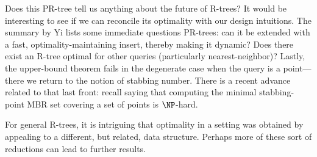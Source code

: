 Does this PR-tree tell us anything about the future of R-trees?
It would be interesting to see if we can reconcile its optimality with our design intuitions.
The summary by Yi \cite{yi12} lists some immediate questions PR-trees: can it be extended with a fast, optimality-maintaining insert, thereby making it dynamic?
Does there exist an R-tree optimal for other queries (particularly nearest-neighbor)?
Lastly, the upper-bound theorem fails in the degenerate case when the query is a point---there we return to the notion of stabbing number.
There is a recent advance related to that last front: recall \cite{bergkhosraviverdonschotweele11} saying that computing the minimal stabbing-point MBR set covering a set of points is $\NP$-hard.

For general R-trees, it is intriguing that optimality in a setting was obtained by appealing to a different, but related, data structure.
Perhaps more of these sort of reductions can lead to further results.
